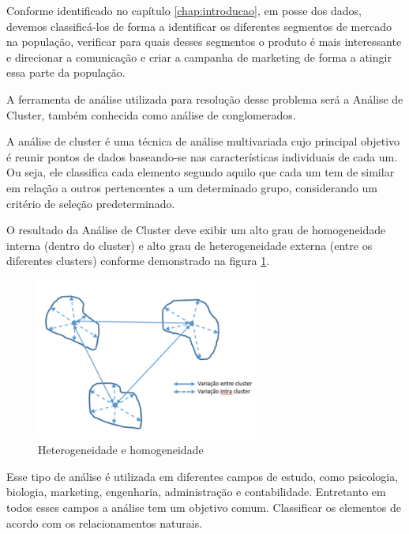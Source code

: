 Conforme identificado no capítulo \ref{chap:introducao}, em posse
dos dados, devemos classificá-los de forma a identificar os diferentes
segmentos de mercado na população, verificar para quais desses segmentos
o produto é mais interessante e direcionar a comunicação e criar a
campanha de marketing de forma a atingir essa parte da população.

A ferramenta de análise utilizada para resolução desse problema será
a Análise de Cluster, também conhecida como análise de conglomerados.

A análise de cluster é uma técnica de análise multivariada cujo principal
objetivo é reunir pontos de dados baseando-se nas características
individuais de cada um. Ou seja, ele classifica cada elemento segundo
aquilo que cada um tem de similar em relação a outros pertencentes
a um determinado grupo, considerando um critério de seleção predeterminado.

O resultado da Análise de Cluster deve exibir um alto grau de homogeneidade
interna (dentro do cluster) e alto grau de heterogeneidade externa
(entre os diferentes clusters) conforme demonstrado na figura \ref{fig:clustering}.

\begin{figure}
\begin{centering}
\includegraphics[width=0.65\textwidth]{Imagens/clustering}
\par\end{centering}

\caption{\label{fig:clustering}Heterogeneidade e homogeneidade}
\end{figure}


Esse tipo de análise é utilizada em diferentes campos de estudo, como
psicologia, biologia, marketing, engenharia, administração e contabilidade.
Entretanto em todos esses campos a análise tem um objetivo comum.
Classificar os elementos de acordo com os relacionamentos naturais.


